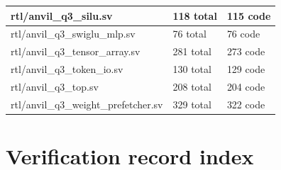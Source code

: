 \documentclass[11pt,a4paper]{article}
\begin{document}
{\begin{longtable}{@{}L{0.55\textwidth}|L{0.18\textwidth}|L{0.18\textwidth}@{}}
rtl/\allowbreak{}anvil\_\allowbreak{}q3\_\allowbreak{}silu.sv & 118 total & 115 code\\[2pt]\hline

rtl/\allowbreak{}anvil\_\allowbreak{}q3\_\allowbreak{}swiglu\_\allowbreak{}mlp.sv & 76 total & 76 code\\[2pt]\hline

rtl/\allowbreak{}anvil\_\allowbreak{}q3\_\allowbreak{}tensor\_\allowbreak{}array.sv & 281 total & 273 code\\[2pt]\hline

rtl/\allowbreak{}anvil\_\allowbreak{}q3\_\allowbreak{}token\_\allowbreak{}io.sv & 130 total & 129 code\\[2pt]\hline

rtl/\allowbreak{}anvil\_\allowbreak{}q3\_\allowbreak{}top.sv & 208 total & 204 code\\[2pt]\hline

rtl/\allowbreak{}anvil\_\allowbreak{}q3\_\allowbreak{}weight\_\allowbreak{}prefetcher.sv & 329 total & 322 code\\[2pt]\hline

\bottomrule\end{longtable}}

\section{Verification record index}
\end{document}
